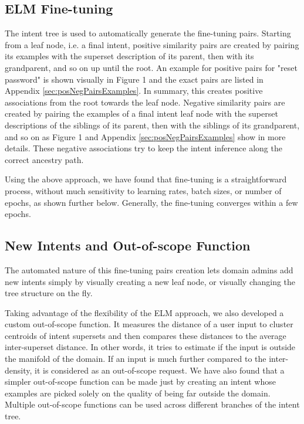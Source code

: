 \documentclass[sigconf, anonymous=true]{acmart}
\begin{document}
\subsection{ELM Fine-tuning}
\label{ELMFineTuning}
The intent tree is used to automatically generate the fine-tuning pairs. Starting from a leaf node, i.e. a final intent, positive similarity pairs are created by pairing its examples with the superset description of its parent, then with its grandparent, and so on up until the root. An example for positive pairs for "reset password" is shown visually in Figure 1 and the exact pairs are listed in Appendix \ref{sec:posNegPairsExamples}. In summary, this creates positive associations from the root towards the leaf node. Negative similarity pairs are created by pairing the examples of a final intent leaf node with the superset descriptions of the siblings of its parent, then with the siblings of its grandparent, and so on as Figure 1 and Appendix \ref{sec:posNegPairsExamples} show in more details. These negative associations try to keep the intent inference along the correct ancestry path.

Using the above approach, we have found that fine-tuning is a straightforward process, without much sensitivity to learning rates, batch sizes, or number of epochs, as shown further below. Generally, the fine-tuning converges within a few epochs. 

\subsection{New Intents and Out-of-scope Function}
The automated nature of this fine-tuning pairs creation lets domain admins add new intents simply by visually creating a new leaf node, or visually changing the tree structure on the fly.  

Taking advantage of the flexibility of the ELM approach, we also developed a custom out-of-scope function. It measures the distance of a user input to cluster centroids of intent supersets and then compares these distances to the average inter-superset distance. In other words, it tries to estimate if the input is outside the manifold of the domain. If an input is much further compared to the inter-density, it is considered as an out-of-scope request. We have also found that a simpler out-of-scope function can be made just by creating an intent whose examples are picked solely on the quality of being far outside the domain. Multiple out-of-scope functions can be used across different branches of the intent tree. 
\end{document}
